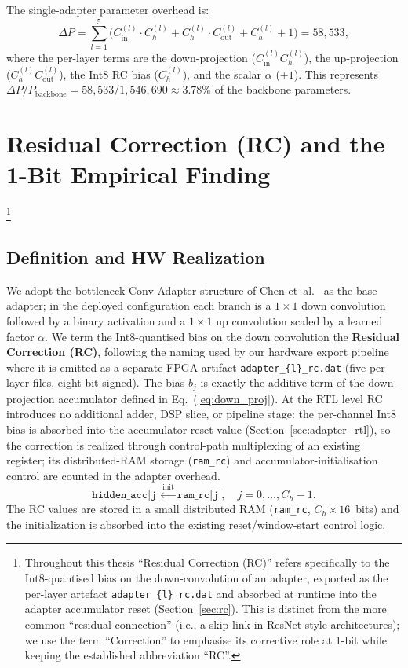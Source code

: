 \documentclass[12pt, a4paper]{report}
\numberwithin{equation}{chapter}
\numberwithin{figure}{chapter}
\numberwithin{table}{chapter}
\numberwithin{algorithm}{chapter}
\begin{document}
The single-adapter parameter overhead is:
\begin{equation}
\Delta P = \sum_{l=1}^{5} \bigl( C_{\text{in}}^{(l)} \cdot C_h^{(l)} + C_h^{(l)} \cdot C_{\text{out}}^{(l)} + C_h^{(l)} + 1 \bigr) = 58{,}533,
\end{equation}
where the per-layer terms are the down-projection ($C_{\text{in}}^{(l)} C_h^{(l)}$), the up-projection ($C_h^{(l)} C_{\text{out}}^{(l)}$), the Int8 RC bias ($C_h^{(l)}$), and the scalar $\alpha$ ($+1$). This represents $\Delta P / P_{\text{backbone}} = 58{,}533 / 1{,}546{,}690 \approx 3.78\%$ of the backbone parameters.

\section{Residual Correction (RC) and the 1-Bit Empirical Finding}\footnote{Throughout this thesis ``Residual Correction (RC)'' refers specifically to the Int8-quantised bias on the down-convolution of an adapter, exported as the per-layer artefact \texttt{adapter\_\{l\}\_rc.dat} and absorbed at runtime into the adapter accumulator reset (Section~\ref{sec:rc}). This is distinct from the more common ``residual connection'' (i.e., a skip-link in ResNet-style architectures); we use the term ``Correction'' to emphasise its corrective role at 1-bit while keeping the established abbreviation ``RC''.}
\label{sec:rc}

\subsection{Definition and HW Realization}

We adopt the bottleneck Conv-Adapter structure of Chen et~al.~\cite{Chen2024ConvAdapter} as the base adapter; in the deployed configuration each branch is a $1\times 1$ down convolution followed by a binary activation and a $1\times 1$ up convolution scaled by a learned factor $\alpha$. We term the Int8-quantised bias on the down convolution the \textbf{Residual Correction (RC)}, following the naming used by our hardware export pipeline where it is emitted as a separate FPGA artifact \texttt{adapter\_\{l\}\_rc.dat} (five per-layer files, eight-bit signed). The bias $b_j$ is exactly the additive term of the down-projection accumulator defined in Eq.~(\ref{eq:down_proj}).
At the RTL level RC introduces no additional adder, DSP slice, or pipeline stage: the per-channel Int8 bias is absorbed into the accumulator reset value (Section~\ref{sec:adapter_rtl}), so the correction is realized through control-path multiplexing of an existing register; its distributed-RAM storage (\texttt{ram\_rc}) and accumulator-initialisation control are counted in the adapter overhead.
\begin{equation}
\texttt{hidden\_acc[j]} \xleftarrow{\text{init}} \texttt{ram\_rc[j]}, \quad j = 0, \ldots, C_h - 1.
\end{equation}
The RC values are stored in a small distributed RAM (\texttt{ram\_rc}, $C_h \times 16$~bits) and the initialization is absorbed into the existing reset/window-start control logic.
\end{document}

